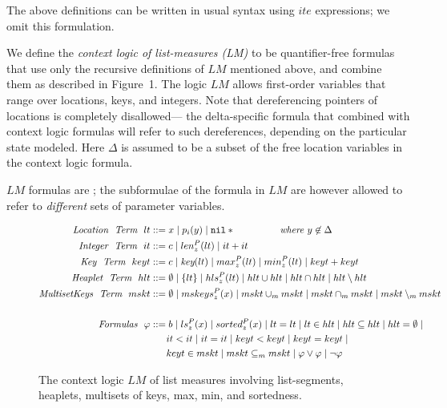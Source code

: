 \begin{definition}
\begin{itemize}
\end{itemize}
\end{definition}

The above definitions can be written in usual syntax using $\textit{ite}$ expressions; we omit this 
formulation.

We define the \emph{context logic of list-measures (LM)} to be quantifier-free formulas that use only the recursive 
definitions of $LM$ mentioned above, and combine them as described in Figure~1.
The logic $LM$ allows first-order variables that range over locations, keys, and integers. Note that
dereferencing pointers of locations is completely disallowed--- the delta-specific formula that combined
with context logic formulas will refer to such dereferences, depending on the particular state modeled.
Here $\Delta$ is assumed to be a subset of the free location variables in the context logic formula.


$LM$ formulas are ; the subformulae of the formula in $LM$ are however allowed
to refer to \emph{different} sets of parameter variables.

\begin{figure}
   \begin{align*}
   \textit{Location} ~~\textit{Term} ~~lt & ::=  x \mid p_i(y) \mid \texttt{nil} \hfill*{\textit{~~~~~~~~~~~~~where~} y \not \in \Delta}\\
   \textit{Integer} ~~\textit{Term} ~~it & ::=  c \mid len_z^P(lt) \mid it+it \\
   \textit{Key} ~~\textit{Term} ~~keyt & ::=  c \mid \textit{key}(lt) \mid max_z^P(lt) \mid min_z^P(lt) \mid keyt+keyt \\
   \textit{Heaplet}~~ \textit{Term} ~~hlt  & ::=  \emptyset \mid \{ lt \} \mid hls_z^P(lt) \mid hlt \cup hlt \mid hlt \cap hlt \mid hlt \setminus hlt\\
   \textit{MultisetKeys}~~ \textit{Term} ~~mskt & ::= \emptyset \mid mskeys_z^P(x) \mid mskt \cup_m mskt \mid mskt \cap_m mskt \mid mskt \setminus_m mskt\\
   ~&~\\
   \textit{Formulas}~~ \varphi &  ::=  b \mid ls_z^P(x) \mid sorted_z^P(x) \mid lt = lt \mid lt \in hlt \mid hlt \subseteq hlt \mid hlt = \emptyset \mid \\
   ~& ~~~~~ it < it \mid it = it \mid keyt < keyt \mid keyt = keyt \mid \\
   ~& ~~~~~ keyt \in mskt \mid mskt \subseteq_m mskt \mid \varphi \vee \varphi \mid \neg \varphi
   \end{align*}
 \caption{The context logic $LM$ of list measures involving list-segments, heaplets, multisets of keys, max, min, and sortedness.} 
\end{figure}



